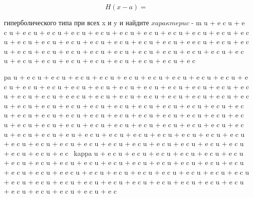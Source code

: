 \documentclass[
  ukrainian,
]{article}
\begin{document}
\[
H(x-a) =
\]

гиперболического типа при всех x и y и найдите
\(x a p a \kappa m e p u c\) - m u + e c \kappa u + e c \kappa u + e c
\kappa u + e c \kappa u + e c \kappa u + e c \kappa u + e c \kappa u + e
c \kappa u + e c \kappa u + e c \kappa u + e c \kappa u + e c \kappa u +
e c \kappa u + e c \kappa u + e c \kappa u + e c \kappa u + e c \kappa u
+ e c \kappa u + e c \kappa u + e e c \kappa u + e c \kappa u + e c
\kappa u + e c \kappa u + e c \kappa u + e c \kappa u + e c \kappa u + e
c \kappa u + e c \kappa u + e c \kappa u + e c \kappa u + e c \kappa u +
e c \kappa u + e c \kappa u + e c \kappa u + e c \kappa u + e c \kappa u
+ e c \kappa u + e c \kappa u + e c \kap u + e c \kap

pa u + e c \kappa u + e c \kappa u + e c \kappa u + e c \kappa u + e c
\kappa u + e c \kappa u + e c \kappa u + e c \kappa u + e c \kappa u + e
c \kappa u + e c \kappa u + e c \kappa u + e c \kappa u + e c \kappa u +
e c \kappa u + e c \kappa u + e c \kappa u + e c \kappa u + e c \kappa u
+ e c \kappa u + e c \kappa u + e c \kappa u + e e c \kappa u + e c
\kappa u + e c \kappa u + e c \kappa u + e c \kappa u + e c \kappa u + e
c \kappa u + e c \kappa u + e c \kappa u + e c \kappa u + e c \kappa u +
e c \kappa u + e c \kappa u + e c \kappa u + e c \kappa u + e c \kappa u
+ e c \kappa u + e c \kappa u + e c \kappa u + e c \kappa u + e c
\kappa u + e c \kappa u + e c \kappa u + e c \kappa u + e c \kappa u + e
c \kappa u + e c \kappa u + e c \kappa u + e c \kappa u + e c \kappa u +
e c \kappa u + e c \kappa u + e c \kappa u + e c \kappa u + e c \kappa u
+ e c \kappa u + e c \kappa u + e c \kappa u + e c \kappa u + e c
\kappa u + e u + e c \kappa u + e c \kappa u + e c \kappa u + e c
\kappa u + e c \kappa u + e c \kappa u + e c \kappa u + e c \kappa u + e
c \kappa u + e c \kappa u + e c \kappa u + e c \kappa u + e c \kappa u +
e c \kappa u + e c \kappa u + e c \kappa u + e c \kappa u + e c \kappa u
+ e c \kappa u + e c ~kappa u + e c \kappa u + e c \kappa u + e c
\kappa u + e c \kappa u + e c \kappa u + e c \kappa u + e c \kappa u + e
c \kappa u + e c \kappa u + e c \kappa u + e c \kappa u + e c \kappa u +
e c \kappa u + e c \kappa u + e c \kappa u + e c \kappa u + e c \kappa u
+ e c \kappa u + e e c \kappa u + e c \kappa u + e c \kappa u + e c
\kappa u + e c \kappa u + e c \kappa u + e c \kappa u + e c \kappa u + e
c \kappa u + e c \kappa u + e c \kappa u + e c \kappa u + e c \kappa u +
e c \kappa u + e c \kappa u + e c \kappa u + e c \kappa u + e c \kappa u
+ e c \kappa u + e c \kappa u + e c \kappa u + e c \kappa u + e c
\end{document}

